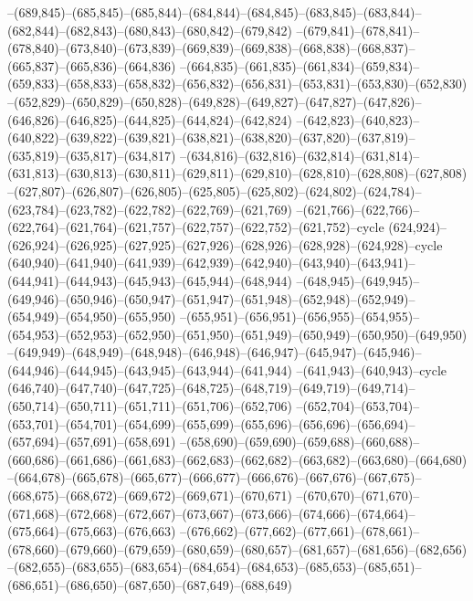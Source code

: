 --(689,845)--(685,845)--(685,844)--(684,844)--(684,845)--(683,845)--(683,844)--(682,844)--(682,843)--(680,843)--(680,842)--(679,842)
--(679,841)--(678,841)--(678,840)--(673,840)--(673,839)--(669,839)--(669,838)--(668,838)--(668,837)--(665,837)--(665,836)--(664,836)
--(664,835)--(661,835)--(661,834)--(659,834)--(659,833)--(658,833)--(658,832)--(656,832)--(656,831)--(653,831)--(653,830)--(652,830)
--(652,829)--(650,829)--(650,828)--(649,828)--(649,827)--(647,827)--(647,826)--(646,826)--(646,825)--(644,825)--(644,824)--(642,824)
--(642,823)--(640,823)--(640,822)--(639,822)--(639,821)--(638,821)--(638,820)--(637,820)--(637,819)--(635,819)--(635,817)--(634,817)
--(634,816)--(632,816)--(632,814)--(631,814)--(631,813)--(630,813)--(630,811)--(629,811)--(629,810)--(628,810)--(628,808)--(627,808)
--(627,807)--(626,807)--(626,805)--(625,805)--(625,802)--(624,802)--(624,784)--(623,784)--(623,782)--(622,782)--(622,769)--(621,769)
--(621,766)--(622,766)--(622,764)--(621,764)--(621,757)--(622,757)--(622,752)--(621,752)--cycle
(624,924)--(626,924)--(626,925)--(627,925)--(627,926)--(628,926)--(628,928)--(624,928)--cycle
(640,940)--(641,940)--(641,939)--(642,939)--(642,940)--(643,940)--(643,941)--(644,941)--(644,943)--(645,943)--(645,944)--(648,944)
--(648,945)--(649,945)--(649,946)--(650,946)--(650,947)--(651,947)--(651,948)--(652,948)--(652,949)--(654,949)--(654,950)--(655,950)
--(655,951)--(656,951)--(656,955)--(654,955)--(654,953)--(652,953)--(652,950)--(651,950)--(651,949)--(650,949)--(650,950)--(649,950)
--(649,949)--(648,949)--(648,948)--(646,948)--(646,947)--(645,947)--(645,946)--(644,946)--(644,945)--(643,945)--(643,944)--(641,944)
--(641,943)--(640,943)--cycle
(646,740)--(647,740)--(647,725)--(648,725)--(648,719)--(649,719)--(649,714)--(650,714)--(650,711)--(651,711)--(651,706)--(652,706)
--(652,704)--(653,704)--(653,701)--(654,701)--(654,699)--(655,699)--(655,696)--(656,696)--(656,694)--(657,694)--(657,691)--(658,691)
--(658,690)--(659,690)--(659,688)--(660,688)--(660,686)--(661,686)--(661,683)--(662,683)--(662,682)--(663,682)--(663,680)--(664,680)
--(664,678)--(665,678)--(665,677)--(666,677)--(666,676)--(667,676)--(667,675)--(668,675)--(668,672)--(669,672)--(669,671)--(670,671)
--(670,670)--(671,670)--(671,668)--(672,668)--(672,667)--(673,667)--(673,666)--(674,666)--(674,664)--(675,664)--(675,663)--(676,663)
--(676,662)--(677,662)--(677,661)--(678,661)--(678,660)--(679,660)--(679,659)--(680,659)--(680,657)--(681,657)--(681,656)--(682,656)
--(682,655)--(683,655)--(683,654)--(684,654)--(684,653)--(685,653)--(685,651)--(686,651)--(686,650)--(687,650)--(687,649)--(688,649)
